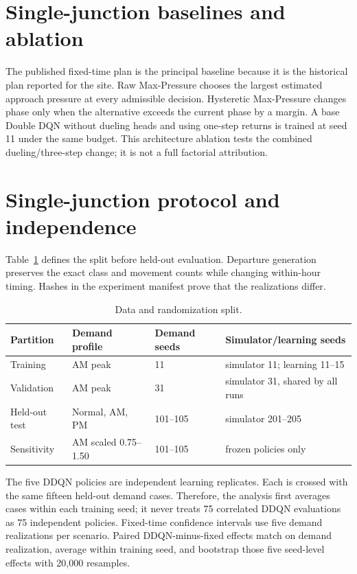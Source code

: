 \documentclass[12pt,a4paper]{report}
\begin{document}
\section{Single-junction baselines and ablation}
The published fixed-time plan is the principal baseline because it is the historical plan reported for the site. Raw Max-Pressure chooses the largest estimated approach pressure at every admissible decision. Hysteretic Max-Pressure changes phase only when the alternative exceeds the current phase by a margin. A base Double DQN without dueling heads and using one-step returns is trained at seed 11 under the same budget. This architecture ablation tests the combined dueling/three-step change; it is not a full factorial attribution.

\section{Single-junction protocol and independence}
Table~\ref{tab:split} defines the split before held-out evaluation. Departure generation preserves the exact class and movement counts while changing within-hour timing. Hashes in the experiment manifest prove that the realizations differ.

\begin{table}[H]
\centering
\caption{Data and randomization split.}\label{tab:split}
\begin{tabularx}{\textwidth}{l>{\raggedright\arraybackslash}Xll}
\toprule
Partition & Demand profile & Demand seeds & Simulator/learning seeds \\
\midrule
Training & AM peak & 11 & simulator 11; learning 11--15 \\
Validation & AM peak & 31 & simulator 31, shared by all runs \\
Held-out test & Normal, AM, PM & 101--105 & simulator 201--205 \\
Sensitivity & AM scaled 0.75--1.50 & 101--105 & frozen policies only \\
\bottomrule
\end{tabularx}
\end{table}

The five DDQN policies are independent learning replicates. Each is crossed with the same fifteen held-out demand cases. Therefore, the analysis first averages cases within each training seed; it never treats 75 correlated DDQN evaluations as 75 independent policies. Fixed-time confidence intervals use five demand realizations per scenario. Paired DDQN-minus-fixed effects match on demand realization, average within training seed, and bootstrap those five seed-level effects with 20,000 resamples.
\end{document}
